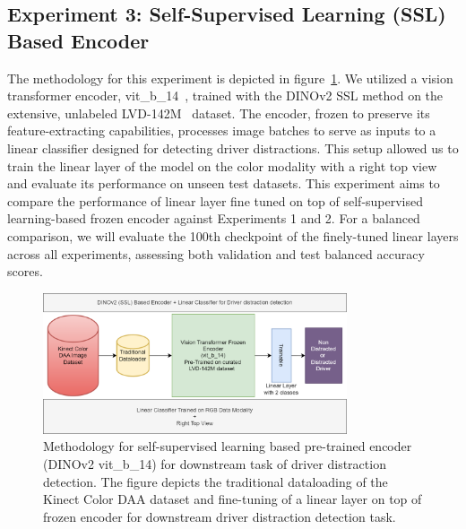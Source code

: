 \subsection{Experiment 3: Self-Supervised Learning (SSL) Based Encoder}
\label{section:Methodology Experiment 3: Self-Supervised Learning Based Encoder}
The methodology for this experiment is depicted in figure~\ref{fig:method_flow_chart_d_a_ssl}. We utilized a vision transformer encoder, vit\_b\_14~\citep{dinov2_github}, trained with the DINOv2 SSL method on the extensive, unlabeled LVD-142M~\citep{dinov2_oquab2023dinov2} dataset. The encoder, frozen to preserve its feature-extracting capabilities, processes image batches to serve as inputs to a linear classifier designed for detecting driver distractions. This setup allowed us to train the linear layer of the model on the color modality with a right top view and evaluate its performance on unseen test datasets. This experiment aims to compare the performance of linear layer fine tuned on top of self-supervised learning-based frozen encoder against Experiments 1 and 2. For a balanced comparison, we will evaluate the 100th checkpoint of the finely-tuned linear layers across all experiments, assessing both validation and test balanced accuracy scores.

\begin{figure}[h]
\begin{center}
\includegraphics[width=0.8\textwidth]{Images_Thesis/methodology_images/methodology_flowchart_ssl_d_a.png}
\end{center}
\caption[Methodology for self-supervised learning based pre-trained encoder for downstream task of driver distraction detection.]{Methodology for self-supervised learning based pre-trained encoder (DINOv2 vit\_b\_14) for downstream task of driver distraction detection. The figure depicts the traditional dataloading of the Kinect Color DAA dataset and fine-tuning of a linear layer on top of frozen encoder for downstream driver distraction detection task.}
\label{fig:method_flow_chart_d_a_ssl}
\end{figure}

